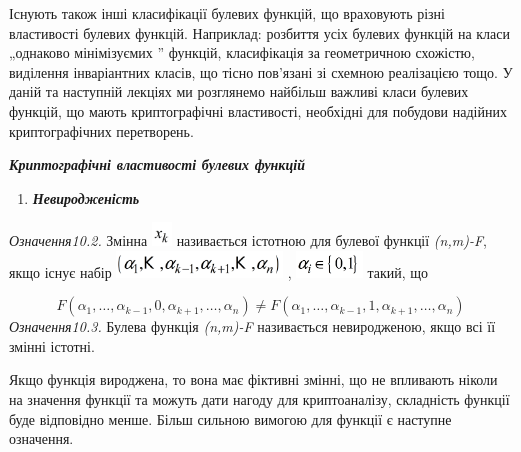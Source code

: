 Існують також інші класифікації булевих функцій, що враховують різні властивості
булевих функцій. Наприклад: розбиття усіх булевих функцій на класи „однаково
мінімізуємих ” функцій, класифікація за геометричною схожістю, виділення
інваріантних класів, що тісно пов’язані зі схемною реалізацією тощо. У даній та
наступній лекціях ми розглянемо найбільш важливі класи булевих функцій, що
мають криптографічні властивості, необхідні для побудови надійних
криптографічних перетворень.


\bigskip

{\centering\bfseries\itshape
Криптографічні властивості булевих функцій
\par}


\bigskip


\bigskip

\liststyleWWviiiNumxxix
\begin{enumerate}
\item {\bfseries\itshape
Невиродженість}
\end{enumerate}
 \textit{Означення10.2.}\textit{ }Змінна  
\includegraphics[width=0.2083in,height=0.25in]{crypt-img/crypt-img193.png} 
називається  істотною для булевої функції 
\textit{(}\textit{n}\textit{,}\textit{m}\textit{)-}\textit{F}, якщо існує набір
 \includegraphics[width=1.7362in,height=0.278in]{crypt-img/crypt-img194.png} , 
\includegraphics[width=0.6937in,height=0.278in]{crypt-img/crypt-img195.png} 
такий, що 

\begin{equation*}
{F(\alpha _{1},\dots,\alpha _{k-1},0,\alpha
_{k+1},\dots,\alpha _{n})\neq F(\alpha
_{1},\dots,\alpha _{k-1},1,\alpha
_{k+1},\dots,\alpha _{n})}
\end{equation*}
 \textit{Означення10.3.}\textit{ }Булева функція
\textit{(}\textit{n}\textit{,}\textit{m}\textit{)-}\textit{F}  називається
невиродженою, якщо всі її змінні істотні.

Якщо функція вироджена, то вона має фіктивні змінні, що не впливають ніколи на
значення функції та можуть дати нагоду для криптоаналізу, складність функції
буде відповідно менше. Більш сильною вимогою для функції є наступне означення.


